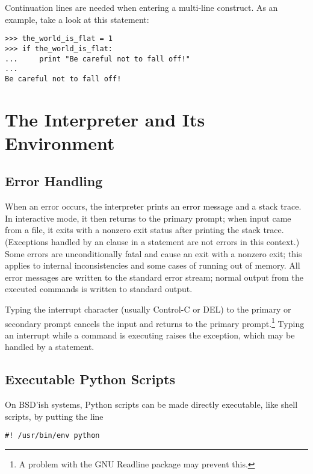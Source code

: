 \documentclass{manual}
\begin{document}
Continuation lines are needed when entering a multi-line construct.
As an example, take a look at this  statement:

\begin{verbatim}
>>> the_world_is_flat = 1
>>> if the_world_is_flat:
...     print "Be careful not to fall off!"
... 
Be careful not to fall off!
\end{verbatim}


\section{The Interpreter and Its Environment \label{interp}}

\subsection{Error Handling \label{error}}

When an error occurs, the interpreter prints an error
message and a stack trace.  In interactive mode, it then returns to
the primary prompt; when input came from a file, it exits with a
nonzero exit status after printing
the stack trace.  (Exceptions handled by an  clause in a
 statement are not errors in this context.)  Some errors are
unconditionally fatal and cause an exit with a nonzero exit; this
applies to internal inconsistencies and some cases of running out of
memory.  All error messages are written to the standard error stream;
normal output from the executed commands is written to standard
output.

Typing the interrupt character (usually Control-C or DEL) to the
primary or secondary prompt cancels the input and returns to the
primary prompt.\footnote{
        A problem with the GNU Readline package may prevent this.
}
Typing an interrupt while a command is executing raises the
 exception, which may be handled by a
 statement.

\subsection{Executable Python Scripts \label{scripts}}

On BSD'ish \UNIX{} systems, Python scripts can be made directly
executable, like shell scripts, by putting the line

\begin{verbatim}
#! /usr/bin/env python
\end{verbatim}
\end{document}
